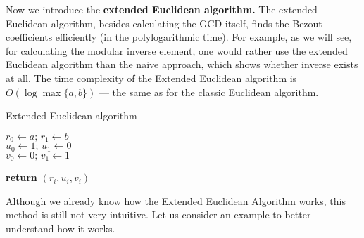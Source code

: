 \documentclass[../lecture-notes-148x210.tex]{subfiles}
\begin{document}
Now we introduce the \textbf{extended Euclidean algorithm.} The extended
Euclidean algorithm, besides calculating the GCD itself, finds the Bezout
coefficients efficiently (in the polylogarithmic time). For example, as we will
see, for calculating the modular inverse element, one would rather use the
extended Euclidean algorithm than the naive approach, which shows whether
inverse exists at all. The time complexity of the Extended Euclidean algorithm
is $O(\log\max\{a,b\})$ --- the same as for the classic Euclidean
algorithm.

\begin{algorithm}[H]
    \caption{Extended Euclidean algorithm} \label{alg:extended_euclidean}
        
    $r_{0} \gets a; \, r_{1} \gets b$ \\
    $u_{0} \gets 1; \, u_{1} \gets 0$ \\
    $v_{0} \gets 0; \, v_{1} \gets 1$ \\


    \textbf{return} $(r_i, u_i, v_i)$
\end{algorithm}

Although we already know how the Extended Euclidean Algorithm
works, this method is still not very intuitive. Let us consider an example to
better understand how it works.
\end{document}
